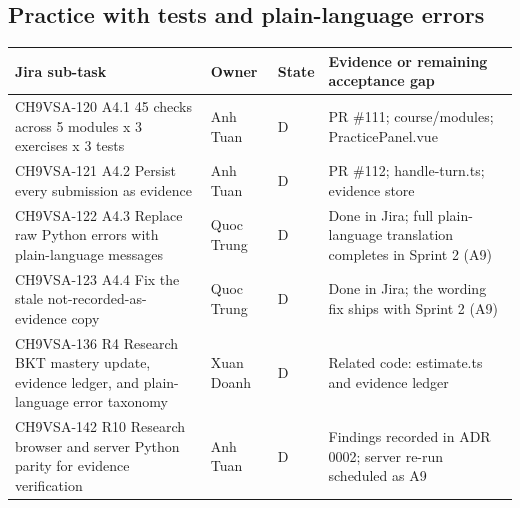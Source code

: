 \documentclass[11pt,a4paper]{article}
\begin{document}
\subsection{Practice with tests and plain-language errors}
{\small
\begin{longtable}{>{\raggedright\arraybackslash}p{}>{\raggedright\arraybackslash}p{}>{\raggedright\arraybackslash}p{}>{\raggedright\arraybackslash}p{}}
\toprule
\textbf{Jira sub-task} & \textbf{Owner} & \textbf{State} & \textbf{Evidence or remaining acceptance gap} \\
\midrule
\endhead
CH9VSA-120 \newline A4.1 45 checks across 5 modules x 3 exercises x 3 tests & Anh Tuan & D & PR \#111; course/modules; PracticePanel.vue \\
CH9VSA-121 \newline A4.2 Persist every submission as evidence & Anh Tuan & D & PR \#112; handle-turn.ts; evidence store \\
CH9VSA-122 \newline A4.3 Replace raw Python errors with plain-language messages & Quoc Trung & D & Done in Jira; full plain-language translation completes in Sprint 2 (A9) \\
CH9VSA-123 \newline A4.4 Fix the stale not-recorded-as-evidence copy & Quoc Trung & D & Done in Jira; the wording fix ships with Sprint 2 (A9) \\
CH9VSA-136 \newline R4 Research BKT mastery update, evidence ledger, and plain-language error taxonomy & Xuan Doanh & D & Related code: estimate.ts and evidence ledger \\
CH9VSA-142 \newline R10 Research browser and server Python parity for evidence verification & Anh Tuan & D & Findings recorded in ADR 0002; server re-run scheduled as A9 \\
\bottomrule
\end{longtable}}
\end{document}
